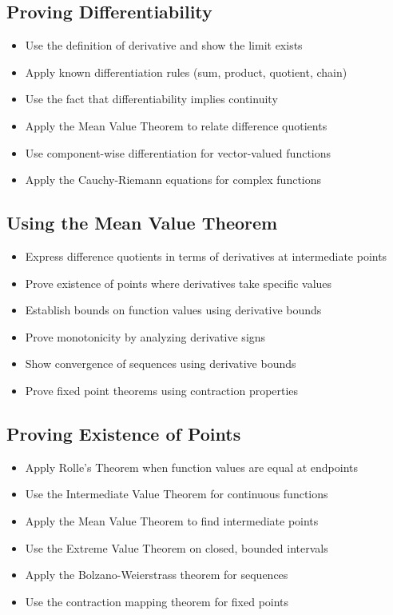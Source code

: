 \subsection*{Proving Differentiability}
\begin{itemize}
\item Use the definition of derivative and show the limit exists
\item Apply known differentiation rules (sum, product, quotient, chain)
\item Use the fact that differentiability implies continuity
\item Apply the Mean Value Theorem to relate difference quotients
\item Use component-wise differentiation for vector-valued functions
\item Apply the Cauchy-Riemann equations for complex functions
\end{itemize}

\subsection*{Using the Mean Value Theorem}
\begin{itemize}
\item Express difference quotients in terms of derivatives at intermediate points
\item Prove existence of points where derivatives take specific values
\item Establish bounds on function values using derivative bounds
\item Prove monotonicity by analyzing derivative signs
\item Show convergence of sequences using derivative bounds
\item Prove fixed point theorems using contraction properties
\end{itemize}

\subsection*{Proving Existence of Points}
\begin{itemize}
\item Apply Rolle's Theorem when function values are equal at endpoints
\item Use the Intermediate Value Theorem for continuous functions
\item Apply the Mean Value Theorem to find intermediate points
\item Use the Extreme Value Theorem on closed, bounded intervals
\item Apply the Bolzano-Weierstrass theorem for sequences
\item Use the contraction mapping theorem for fixed points
\end{itemize}


